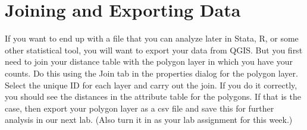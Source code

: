 \documentclass[]{book}
\begin{document}
\hypertarget{joining-and-exporting-data}{%
\section{Joining and Exporting Data}\label{joining-and-exporting-data}}

If you want to end up with a file that you can analyze later in Stata, R, or some other statistical tool, you will want to export your data from QGIS. But you first need to join your distance table with the polygon layer in which you have your counts. Do this using the Join tab in the properties dialog for the polygon layer. Select the unique ID for each layer and carry out the join. If you do it correctly, you should see the distances in the attribute table for the polygons. If that is the case, then export your polygon layer as a csv file and save this for further analysis in our next lab. (Also turn it in as your lab assignment for this week.)


\end{document}

